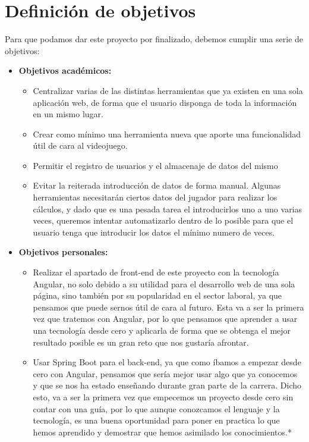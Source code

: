 \chapter{Definici\'on de objetivos}\label{defobjetivos}

Para que podamos dar este proyecto por finalizado, debemos cumplir una serie de objetivos:

\begin{itemize}
	\item \textbf{Objetivos académicos:}
	\begin{itemize}
		\item Centralizar varias de las distintas herramientas que ya existen en una sola aplicación web, de forma que el usuario disponga de toda la información en un mismo lugar.
		
		\item Crear como mínimo una herramienta nueva que aporte una funcionalidad útil de cara al videojuego.
		
		\item Permitir el registro de usuarios y el almacenaje de datos del mismo
		
		\item Evitar la reiterada introducción de datos de forma manual. Algunas herramientas necesitarán ciertos datos del jugador para realizar los cálculos, y dado que es una pesada tarea el introducirlos uno a uno varias veces, queremos intentar automatizarlo dentro de lo posible para que el usuario tenga que introducir los datos el mínimo numero de veces.
	\end{itemize}
	\item \textbf{Objetivos personales:}
	\begin{itemize}
		\item Realizar el apartado de front-end de este proyecto con la tecnología Angular, no solo debido a su utilidad para el desarrollo web de una sola página, sino también por su popularidad en el sector laboral, ya que pensamos que puede sernos útil de cara al futuro. Esta va a ser la primera vez que tratemos con Angular, por lo que pensamos que aprender a usar una tecnología desde cero y aplicarla de forma que se obtenga el mejor resultado posible es un gran reto que nos gustaría afrontar.
		
		\item Usar Spring Boot para el back-end, ya que como íbamos a empezar desde cero con Angular, pensamos que sería mejor usar algo que ya conocemos y que se nos ha estado enseñando durante gran parte de la carrera. Dicho esto, va a ser la primera vez que empecemos un proyecto desde cero sin contar con una guía, por lo que aunque conozcamos el lenguaje y la tecnología, es una buena oportunidad para poner en practica lo que hemos aprendido y demostrar que hemos asimilado los conocimientos.*\\
		

\end{itemize}
\end{itemize}
